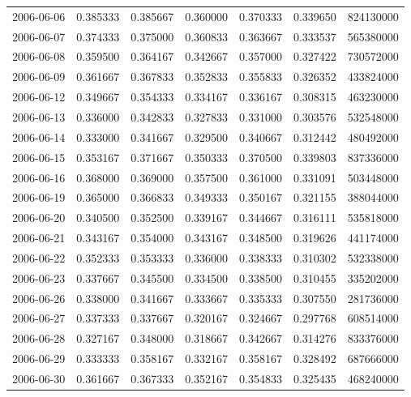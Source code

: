 \begin{tabular}{lrrrrrr}
2006-06-06 &    0.385333 &    0.385667 &    0.360000 &    0.370333 &    0.339650 &   824130000 \\
2006-06-07 &    0.374333 &    0.375000 &    0.360833 &    0.363667 &    0.333537 &   565380000 \\
2006-06-08 &    0.359500 &    0.364167 &    0.342667 &    0.357000 &    0.327422 &   730572000 \\
2006-06-09 &    0.361667 &    0.367833 &    0.352833 &    0.355833 &    0.326352 &   433824000 \\
2006-06-12 &    0.349667 &    0.354333 &    0.334167 &    0.336167 &    0.308315 &   463230000 \\
2006-06-13 &    0.336000 &    0.342833 &    0.327833 &    0.331000 &    0.303576 &   532548000 \\
2006-06-14 &    0.333000 &    0.341667 &    0.329500 &    0.340667 &    0.312442 &   480492000 \\
2006-06-15 &    0.353167 &    0.371667 &    0.350333 &    0.370500 &    0.339803 &   837336000 \\
2006-06-16 &    0.368000 &    0.369000 &    0.357500 &    0.361000 &    0.331091 &   503448000 \\
2006-06-19 &    0.365000 &    0.366833 &    0.349333 &    0.350167 &    0.321155 &   388044000 \\
2006-06-20 &    0.340500 &    0.352500 &    0.339167 &    0.344667 &    0.316111 &   535818000 \\
2006-06-21 &    0.343167 &    0.354000 &    0.343167 &    0.348500 &    0.319626 &   441174000 \\
2006-06-22 &    0.352333 &    0.353333 &    0.336000 &    0.338333 &    0.310302 &   532338000 \\
2006-06-23 &    0.337667 &    0.345500 &    0.334500 &    0.338500 &    0.310455 &   335202000 \\
2006-06-26 &    0.338000 &    0.341667 &    0.333667 &    0.335333 &    0.307550 &   281736000 \\
2006-06-27 &    0.337333 &    0.337667 &    0.320167 &    0.324667 &    0.297768 &   608514000 \\
2006-06-28 &    0.327167 &    0.348000 &    0.318667 &    0.342667 &    0.314276 &   833376000 \\
2006-06-29 &    0.333333 &    0.358167 &    0.332167 &    0.358167 &    0.328492 &   687666000 \\
2006-06-30 &    0.361667 &    0.367333 &    0.352167 &    0.354833 &    0.325435 &   468240000 \\

\end{tabular}
